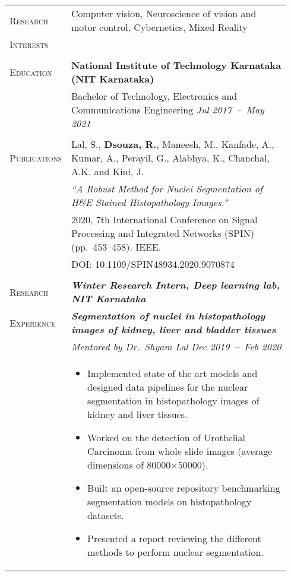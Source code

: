 \documentclass[letterpaper, 10pt, oneside]{article}
\newcommand{\stitle}[1]{\normalsize{\textsc{#1}}}
\newcommand{\bdit}[1]{\textit{\textbf{#1}}}
\begin{document}
\noindent \begin{longtable}{@{} p{0.14\linewidth} p{0.8\linewidth}}

\stitle{Research}  & Computer vision, Neuroscience of vision and motor control, Cybernetics, Mixed Reality \\
\stitle{Interests} & \\
\\


\stitle{Education} & \textbf{National Institute of Technology Karnataka (NIT Karnataka)} \\
                   & Bachelor of Technology, Electronics and Communications Engineering \hfill \hspace{-3em} \textit{Jul 2017\ --\ May 2021} \\
\\


\stitle{Publications} & Lal, S., \textbf{Dsouza, R.}, Maneesh, M., Kanfade, A., Kumar, A., Perayil, G., Alabhya, K., Chanchal, A.K. and Kini, J. \\
                      & \textit{``A Robust Method for Nuclei Segmentation of H\&E Stained Histopathology Images.''} \\
                      & 2020, 7th International Conference on Signal Processing and Integrated Networks (SPIN) (pp.~453--458)\@. IEEE\@.  \\
                      & \textcolor{dark-purple}{DOI\@: 10.1109/SPIN48934.2020.9070874} \\
\\


\stitle{Research}   & \bdit{Winter Research Intern, Deep learning lab, NIT Karnataka} \\
\stitle{Experience} & \bdit{Segmentation of nuclei in histopathology images of kidney, liver and bladder tissues} \\
                    & \textit{Mentored by Dr.\ Shyam Lal} \hfill \hspace{-3em} \textit{Dec 2019\ --\ Feb 2020} \\
                    & \parbox{0.8\textwidth}{%
                        \begin{itemize}[leftmargin=*, itemsep=-0.88ex, topsep=-0.88ex]
                            \item Implemented state of the art models and designed data pipelines for the nuclear segmentation in histopathology images of kidney and liver tissues. 
                            \item Worked on the detection of Urothelial Carcinoma from whole slide images (average dimensions of 80000$\times$50000).
                            \item Built an open-source repository benchmarking segmentation models on histopathology datasets.
                            \item Presented a report reviewing the different methods to perform nuclear segmentation.
                        \end{itemize}
                    }
\\
\\


\end{longtable}
\end{document}
